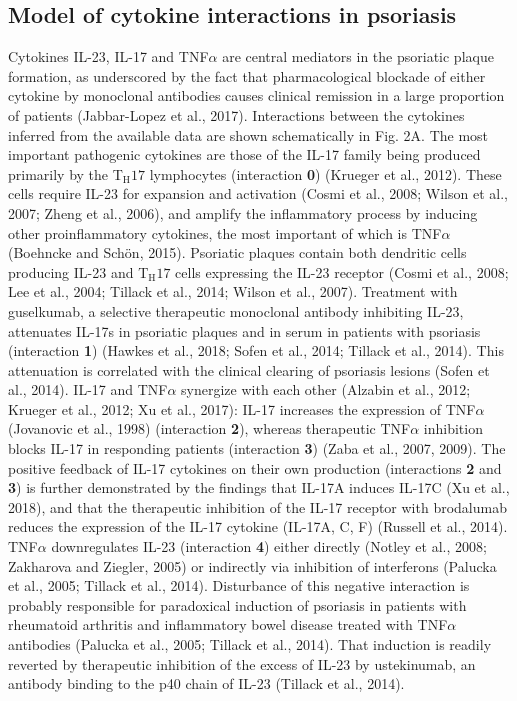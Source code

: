 \subsection{Model of cytokine interactions in psoriasis}
Cytokines IL-23, IL-17 and TNF$\alpha$ are central mediators in the psoriatic plaque formation, as underscored by the fact that pharmacological blockade of either cytokine by monoclonal antibodies causes clinical remission in a large proportion of patients (Jabbar-Lopez et al., 2017). Interactions between the cytokines inferred from the available data are shown schematically in Fig. 2A. The most important pathogenic cytokines are those of the IL-17 family being produced primarily by the T$_{\text{H}}17$ lymphocytes (interaction \textbf{0}) (Krueger et al., 2012). These cells require IL-23 for expansion and activation (Cosmi et al., 2008; Wilson et al., 2007; Zheng et al., 2006), and amplify the inflammatory process by inducing other proinflammatory cytokines, the most important of which is TNF$\alpha$ (Boehncke and Schön, 2015). Psoriatic plaques contain both dendritic cells producing IL-23 and T$_{\text{H}}17$ cells expressing the IL-23 receptor (Cosmi et al., 2008; Lee et al., 2004; Tillack et al., 2014; Wilson et al., 2007). Treatment with guselkumab, a selective therapeutic monoclonal antibody inhibiting IL-23, attenuates IL-17s in psoriatic plaques and in serum in patients with psoriasis (interaction \textbf{1}) (Hawkes et al., 2018; Sofen et al., 2014; Tillack et al., 2014). This attenuation is correlated with the clinical clearing of psoriasis lesions (Sofen et al., 2014). IL-17 and TNF$\alpha$ synergize with each other (Alzabin et al., 2012; Krueger et al., 2012; Xu et al., 2017): IL-17 increases the expression of TNF$\alpha$ (Jovanovic et al., 1998) (interaction \textbf{2}), whereas therapeutic TNF$\alpha$ inhibition blocks IL-17 in responding patients (interaction \textbf{3}) (Zaba et al., 2007, 2009). The positive feedback of IL-17 cytokines on their own production (interactions \textbf{2} and \textbf{3}) is further demonstrated by the findings that IL-17A induces IL-17C (Xu et al., 2018), and that the therapeutic inhibition of the IL-17 receptor with brodalumab reduces the expression of the IL-17 cytokine (IL-17A, C, F) (Russell et al., 2014). TNF$\alpha$ downregulates IL-23 (interaction \textbf{4}) either directly (Notley et al., 2008; Zakharova and Ziegler, 2005) or indirectly via inhibition of interferons (Palucka et al., 2005; Tillack et al., 2014). Disturbance of this negative interaction is probably responsible for paradoxical induction of psoriasis in patients with rheumatoid arthritis and inflammatory bowel disease treated with TNF$\alpha$ antibodies (Palucka et al., 2005; Tillack et al., 2014). That induction is readily reverted by therapeutic inhibition of the excess of IL-23 by ustekinumab, an antibody binding to the p40 chain of IL-23 (Tillack et al., 2014). 

